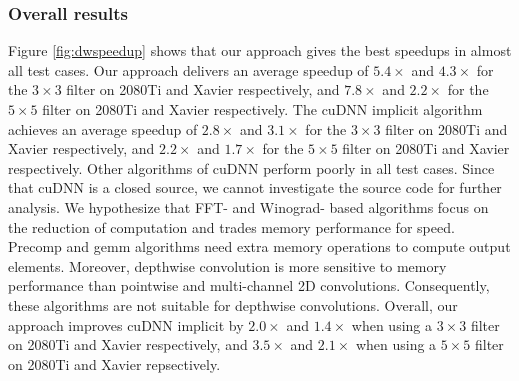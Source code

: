 \subsubsection{Overall results}
Figure \ref{fig:dwspeedup} shows that our approach gives the best speedups in almost all test cases. 
Our approach delivers an average speedup of $5.4\times$ and $4.3\times$ for the $3 \times 3$ filter on 2080Ti and Xavier respectively, and $7.8\times$ and $2.2\times$ for the $5 \times 5$ filter on 2080Ti and Xavier respectively.
The cuDNN implicit algorithm achieves an average speedup of $2.8\times$ and $3.1\times$ for the $3 \times 3$ filter on 2080Ti and Xavier respectively, and $2.2\times$ and $1.7\times$ for the $5 \times 5$ filter on 2080Ti and Xavier respectively.
Other algorithms of cuDNN perform poorly in all test cases. 
Since that cuDNN is a closed source, we cannot investigate the source code for further analysis. 
We hypothesize that FFT- and Winograd- based algorithms focus on the reduction of computation and trades memory performance for speed. 
Precomp and gemm algorithms need extra memory operations to compute output elements. 
Moreover, depthwise convolution is more sensitive to memory performance than pointwise and multi-channel 2D convolutions. 
Consequently, these algorithms are not suitable for depthwise convolutions. 
Overall, our approach improves cuDNN implicit by $2.0\times$ and $1.4\times$ when using a $3 \times 3$  filter on 2080Ti and Xavier respectively, and $3.5\times$ and $2.1\times$ when using a $5 \times 5$ filter on 2080Ti and Xavier repsectively.
